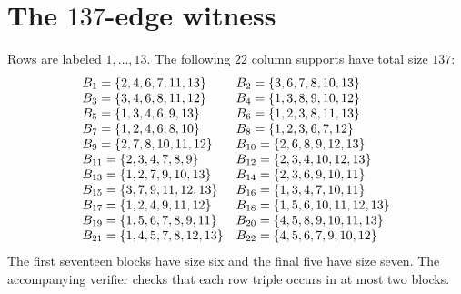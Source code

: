 \documentclass[11pt]{amsart}
\begin{document}
\section{The $137$-edge witness}\label{app:witness}
\label{sec:witness-appendix}
Rows are labeled $1,\dots,13$. The following $22$ column supports have total size $137$:
\[
\begin{array}{@{}ll@{}}
B_{1}=\{2,4,6,7,11,13\} & B_{2}=\{3,6,7,8,10,13\}\\
B_{3}=\{3,4,6,8,11,12\} & B_{4}=\{1,3,8,9,10,12\}\\
B_{5}=\{1,3,4,6,9,13\} & B_{6}=\{1,2,3,8,11,13\}\\
B_{7}=\{1,2,4,6,8,10\} & B_{8}=\{1,2,3,6,7,12\}\\
B_{9}=\{2,7,8,10,11,12\} & B_{10}=\{2,6,8,9,12,13\}\\
B_{11}=\{2,3,4,7,8,9\} & B_{12}=\{2,3,4,10,12,13\}\\
B_{13}=\{1,2,7,9,10,13\} & B_{14}=\{2,3,6,9,10,11\}\\
B_{15}=\{3,7,9,11,12,13\} & B_{16}=\{1,3,4,7,10,11\}\\
B_{17}=\{1,2,4,9,11,12\} & B_{18}=\{1,5,6,10,11,12,13\}\\
B_{19}=\{1,5,6,7,8,9,11\} & B_{20}=\{4,5,8,9,10,11,13\}\\
B_{21}=\{1,4,5,7,8,12,13\} & B_{22}=\{4,5,6,7,9,10,12\}\\
\end{array}
\]
The first seventeen blocks have size six and the final five have size seven. The accompanying verifier checks that each row triple occurs in at most two blocks.
\end{document}
